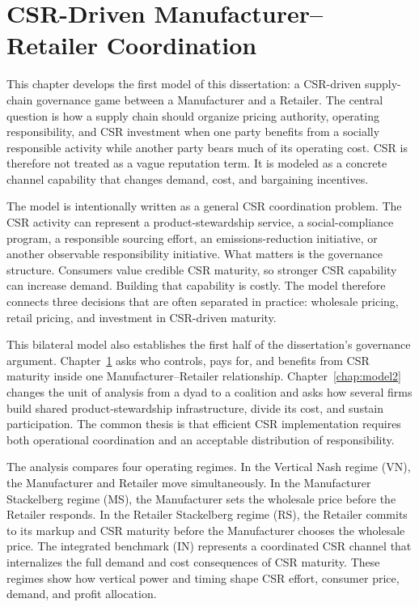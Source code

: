 \chapter{CSR-Driven Manufacturer--Retailer Coordination}
\label{chap:model1}

This chapter develops the first model of this dissertation: a CSR-driven supply-chain governance game between a Manufacturer and a Retailer. The central question is how a supply chain should organize pricing authority, operating responsibility, and CSR investment when one party benefits from a socially responsible activity while another party bears much of its operating cost. CSR is therefore not treated as a vague reputation term. It is modeled as a concrete channel capability that changes demand, cost, and bargaining incentives.

The model is intentionally written as a general CSR coordination problem. The CSR activity can represent a product-stewardship service, a social-compliance program, a responsible sourcing effort, an emissions-reduction initiative, or another observable responsibility initiative. What matters is the governance structure. Consumers value credible CSR maturity, so stronger CSR capability can increase demand. Building that capability is costly. The model therefore connects three decisions that are often separated in practice: wholesale pricing, retail pricing, and investment in CSR-driven maturity.

This bilateral model also establishes the first half of the dissertation's governance argument. Chapter~\ref{chap:model1} asks who controls, pays for, and benefits from CSR maturity inside one Manufacturer--Retailer relationship. Chapter~\ref{chap:model2} changes the unit of analysis from a dyad to a coalition and asks how several firms build shared product-stewardship infrastructure, divide its cost, and sustain participation. The common thesis is that efficient CSR implementation requires both operational coordination and an acceptable distribution of responsibility.

The analysis compares four operating regimes. In the Vertical Nash regime (VN), the Manufacturer and Retailer move simultaneously. In the Manufacturer Stackelberg regime (MS), the Manufacturer sets the wholesale price before the Retailer responds. In the Retailer Stackelberg regime (RS), the Retailer commits to its markup and CSR maturity before the Manufacturer chooses the wholesale price. The integrated benchmark (IN) represents a coordinated CSR channel that internalizes the full demand and cost consequences of CSR maturity. These regimes show how vertical power and timing shape CSR effort, consumer price, demand, and profit allocation.

